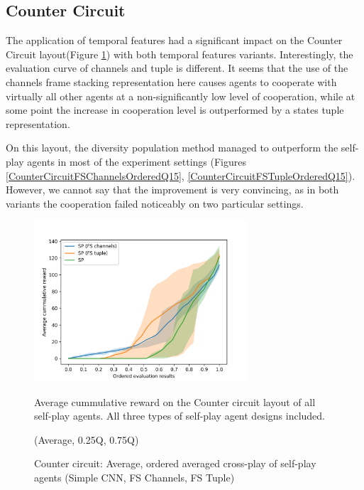 \newpage

\subsection{Counter Circuit}
The application of temporal features had a significant impact on the Counter Circuit layout(Figure \ref{CounterCircuitFSVariantsOrderedAvg}) with both temporal features variants.
Interestingly, the evaluation curve of channels and tuple is different. 
It seems that the use of the channels frame stacking representation here causes agents to cooperate with virtually all other agents at a non-significantly low level of cooperation, while at some point the increase in cooperation level is outperformed by a states tuple representation.

On this layout, the diversity population method managed to outperform the self-play agents in most of the experiment settings (Figures \ref {CounterCircuitFSChannelsOrderedQ15}, \ref {CounterCircuitFSTupleOrderedQ15}).
However, we cannot say that the improvement is very convincing, as in both variants the cooperation failed noticeably on two particular settings. 


\begin{figure}[!ht]
    \centering
    \includegraphics*[width=8cm]{../img/CounterCircuitFSVariantsOrderedAvg.png}

    \caption{Counter circuit: Average, ordered averaged cross-play of self-play agents (Simple CNN, FS Channels, FS Tuple)}
    \label{CounterCircuitFSVariantsOrderedAvg}
    \medskip
    \small 
    Average cummulative reward on the Counter circuit layout of all self-play agents.
    All three types of self-play agent designs included.

    (Average, 0.25Q, 0.75Q)

\end{figure}


